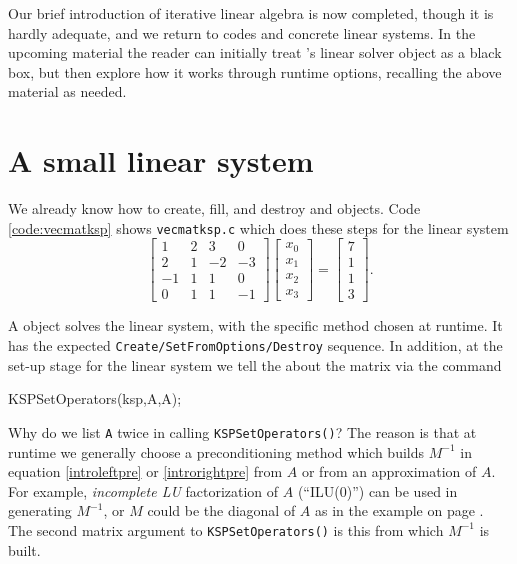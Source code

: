 Our brief introduction of iterative linear algebra is now completed, though it is hardly adequate, and we return to \PETSc codes and concrete linear systems.  In the upcoming material the reader can initially treat \PETSc's \pKSP linear solver object as a black box, but then explore how it works through runtime options, recalling the above material as needed.


\section{A small linear system}

We already know how to create, fill, and destroy \pVec and \pMat objects.  Code \ref{code:vecmatksp} shows \texttt{vecmatksp.c} which does these steps for the linear system
\begin{equation}
\begin{bmatrix} 1 & 2 & 3 & 0 \\
                2 & 1 &-2 &-3 \\
               -1 & 1 & 1 & 0 \\
                0 & 1 & 1 &-1 \end{bmatrix}
\begin{bmatrix} x_0 \\ x_1 \\ x_2 \\ x_3 \end{bmatrix}
=
\begin{bmatrix} 7 \\ 1 \\ 1 \\ 3 \end{bmatrix}.
\end{equation}

A \pKSP object solves the linear system, with the specific method chosen at runtime.  It has the expected \texttt{Create/SetFromOptions/Destroy} sequence.  In addition, at the set-up stage for the linear system we tell the \pKSP about the matrix via the command
\begin{code}
KSPSetOperators(ksp,A,A);
\end{code}
Why do we list \texttt{A} twice in calling \texttt{KSPSetOperators()}?  The reason is that at runtime we generally choose a preconditioning method which builds $M^{-1}$ in equation \eqref{introleftpre} or \eqref{introrightpre} from $A$ or from an approximation of $A$.  For example, \emph{incomplete LU} factorization of $A$ (``ILU($0$)'') can be used in generating $M^{-1}$, or $M$ could be the diagonal of $A$ as in the example on page \pageref{example:ls:jacobirichardson}.  The second matrix argument to \texttt{KSPSetOperators()} is this \pMat from which $M^{-1}$ is built.

